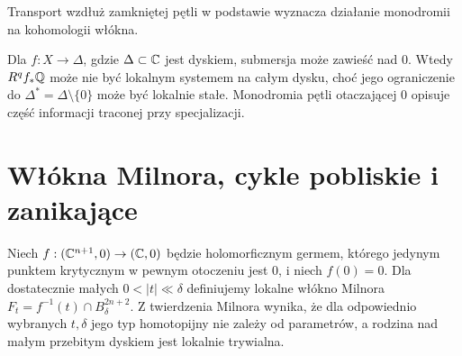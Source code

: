 \begin{center}
\par\medskip\small Transport wzdłuż zamkniętej pętli w podstawie
wyznacza działanie monodromii na kohomologii włókna.
\end{center}

\begin{uwaga}
Dla $f:X\to\Delta$, gdzie $\Delta\subset\mathbb{C}$ jest dyskiem,
submersja może zawieść nad $0$. Wtedy
$R^qf_*\mathbb{Q}$ może nie być lokalnym systemem na całym dysku,
choć jego ograniczenie do $\Delta^*=\Delta\setminus\{0\}$
może być lokalnie stałe. Monodromia pętli otaczającej
$0$ opisuje część informacji traconej przy specjalizacji.
\end{uwaga}

\section{Włókna Milnora, cykle pobliskie i zanikające}
\begin{definicja}
Niech $f:(\mathbb{C}^{n+1},0)\to(\mathbb{C},0)$ będzie holomorficznym
germem, którego jedynym punktem krytycznym w
pewnym otoczeniu jest $0$, i niech $f(0)=0$.
Dla dostatecznie małych $0<|t|\ll\delta$ definiujemy
lokalne włókno Milnora
$F_t=f^{-1}(t)\cap B_\delta^{2n+2}$.
Z twierdzenia Milnora wynika, że dla odpowiednio
wybranych $t,\delta$ jego typ homotopijny nie
zależy od parametrów, a rodzina nad małym
przebitym dyskiem jest lokalnie trywialna.
\end{definicja}

